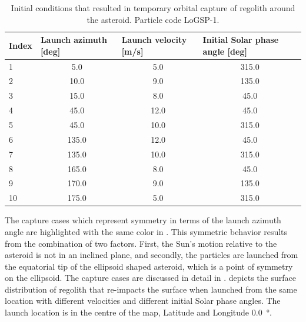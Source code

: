 \begin{table}[htb]
\centering
\captionsetup{justification=centering}
\caption{Initial conditions that resulted in temporary orbital capture of regolith around the asteroid. Particle code LoGSP-1.}
\label{tab:LoGSP_1_capture}
\begin{tabular}{|l|c|c|c|}
\hline
Index & \multicolumn{1}{l|}{Launch azimuth [deg]} & \multicolumn{1}{l|}{Launch velocity [m/s]} & \multicolumn{1}{l|}{Initial Solar phase angle [deg]} \\ \hline
\rowcolor[HTML]{FE996B}
1   & 5.0 & 5.0 & 315.0     \\ \hline
\rowcolor[HTML]{67FD9A}
2   & 10.0 & 9.0 & 135.0    \\ \hline
\rowcolor[HTML]{9698ED}
3   & 15.0 & 8.0 & 45.0     \\ \hline
\rowcolor[HTML]{FFCC67}
4   & 45.0 & 12.0 & 45.0    \\ \hline
\rowcolor[HTML]{96FFFB}
5   & 45.0 & 10.0 & 315.0   \\ \hline
\rowcolor[HTML]{FFCC67}
6   & 135.0 & 12.0 & 45.0   \\ \hline
\rowcolor[HTML]{96FFFB}
7   & 135.0 & 10.0 & 315.0  \\ \hline
\rowcolor[HTML]{9698ED}
8   & 165.0 & 8.0 & 45.0    \\ \hline
\rowcolor[HTML]{67FD9A}
9   & 170.0 & 9.0 & 135.0   \\ \hline
\rowcolor[HTML]{FE996B}
10  & 175.0 & 5.0 & 315.0   \\ \hline
\end{tabular}
\end{table}
\FloatBarrier
The capture cases which represent symmetry in terms of the launch azimuth angle are highlighted with the same color in . This symmetric behavior results from the combination of two factors. First, the Sun's motion relative to the asteroid is not in an inclined plane, and secondly, the particles are launched from the equatorial tip of the ellipsoid shaped asteroid, which is a point of symmetry on the ellipsoid. The capture cases are discussed in detail in .
%
\newline\newline
%
 depicts the surface distribution of regolith that re-impacts the surface when launched from the same location with different velocities and different initial Solar phase angles. The launch location is in the centre of the map, Latitude and Longitude \SI{0.0}{\degree}.
